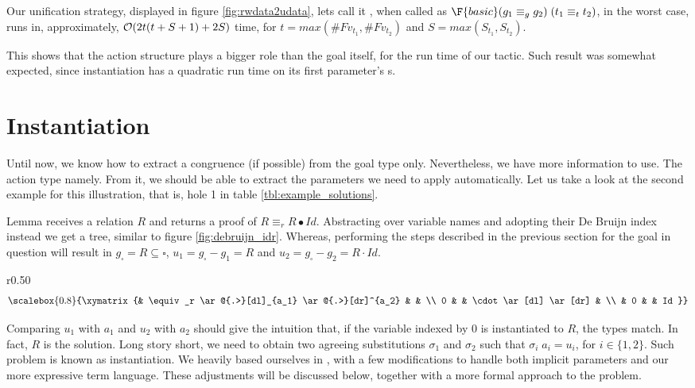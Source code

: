 Our unification strategy, displayed in figure \ref{fig:rwdata2udata}, lets call
it , when called as $\F{basic }(g_1 \equiv_g g_2)\;(t_1 \equiv_t t_2)$,
in the worst case, runs in, approximately, $\mathcal{O}(2t(t + S + 1) + 2S)$ time, for $t = max(\#Fv_{t_1}, \#Fv_{t_2})$ and
$S = max(S_{t_1}, S_{t_2})$.

This shows that the action structure plays a bigger role than the goal itself,
for the run time of our tactic. Such result was somewhat expected, since instantiation
has a quadratic run time on its first parameter's s. 

\section{Instantiation}
\label{sec:tandr:instantiation}

Until now, we know how to extract a congruence (if possible) from the goal type only. Nevertheless,
we have more information to use. The action type namely. From it, we should be able to extract
the parameters we need to apply automatically. Let us take a look at the second example
for this illustration, that is, hole 1 in table \ref{tbl:example_solutions}.

Lemma  receives a relation $R$ and returns a proof of $R \equiv_r R ∙ Id$. Abstracting
over variable names and adopting their De Bruijn index instead we get a tree, similar to figure \ref{fig:debruijn_idr}. Whereas, performing the steps described in the previous section
for the goal in question will result in $g_\square = R \subseteq \square$, $u_1 = g_\square - g_1 = R$
and $u_2 = g_\square - g_2 = R \cdot Id$.

\begin{wrapfigure}{r}{0.50\textwidth}
\begin{displaymath}
\scalebox{0.8}{%
\xymatrix{%
 & \equiv_r \ar@{.>}[dl]_{a_1} \ar@{.>}[dr]^{a_2} & & \\
0 & & \cdot \ar[dl] \ar[dr] & \\
& 0 & & Id
}}
\end{displaymath}
\caption{'s type}
\label{fig:debruijn_idr}
\end{wrapfigure}

Comparing $u_1$ with $a_1$ and $u_2$ with $a_2$ should give the intuition that, if the
variable indexed by $0$ is instantiated to $R$, the types match. In fact, $R$ is the solution.
Long story short, we need to obtain two agreeing substitutions $\sigma_1$ and $\sigma_2$ such
that $\sigma_i\;a_i = u_i$, for $i\in\{1 , 2\}$. Such problem is known as instantiation.
We heavily based ourselves in \cite{wouter13}, with a few modifications to handle both implicit
parameters and our more expressive term language. These adjustments will be discussed below,
together with a more formal approach to the problem.

